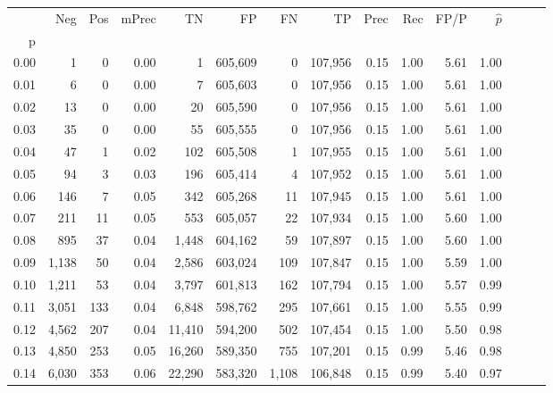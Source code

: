 \begin{tabular}{rrrrrrrrrrrrrrr}
\toprule
{} &     Neg &    Pos & mPrec &       TN &       FP &       FN &       TP &  Prec &   Rec &  FP/P & $\hat{p}$ \\
p    &         &        &       &          &          &          &          &       &       &       &           \\
\midrule
0.00 &       1 &      0 &  0.00 &        1 &  605,609 &        0 &  107,956 &  0.15 &  1.00 &  5.61 &      1.00 \\
0.01 &       6 &      0 &  0.00 &        7 &  605,603 &        0 &  107,956 &  0.15 &  1.00 &  5.61 &      1.00 \\
0.02 &      13 &      0 &  0.00 &       20 &  605,590 &        0 &  107,956 &  0.15 &  1.00 &  5.61 &      1.00 \\
0.03 &      35 &      0 &  0.00 &       55 &  605,555 &        0 &  107,956 &  0.15 &  1.00 &  5.61 &      1.00 \\
0.04 &      47 &      1 &  0.02 &      102 &  605,508 &        1 &  107,955 &  0.15 &  1.00 &  5.61 &      1.00 \\
0.05 &      94 &      3 &  0.03 &      196 &  605,414 &        4 &  107,952 &  0.15 &  1.00 &  5.61 &      1.00 \\
0.06 &     146 &      7 &  0.05 &      342 &  605,268 &       11 &  107,945 &  0.15 &  1.00 &  5.61 &      1.00 \\
0.07 &     211 &     11 &  0.05 &      553 &  605,057 &       22 &  107,934 &  0.15 &  1.00 &  5.60 &      1.00 \\
0.08 &     895 &     37 &  0.04 &    1,448 &  604,162 &       59 &  107,897 &  0.15 &  1.00 &  5.60 &      1.00 \\
0.09 &   1,138 &     50 &  0.04 &    2,586 &  603,024 &      109 &  107,847 &  0.15 &  1.00 &  5.59 &      1.00 \\
0.10 &   1,211 &     53 &  0.04 &    3,797 &  601,813 &      162 &  107,794 &  0.15 &  1.00 &  5.57 &      0.99 \\
0.11 &   3,051 &    133 &  0.04 &    6,848 &  598,762 &      295 &  107,661 &  0.15 &  1.00 &  5.55 &      0.99 \\
0.12 &   4,562 &    207 &  0.04 &   11,410 &  594,200 &      502 &  107,454 &  0.15 &  1.00 &  5.50 &      0.98 \\
0.13 &   4,850 &    253 &  0.05 &   16,260 &  589,350 &      755 &  107,201 &  0.15 &  0.99 &  5.46 &      0.98 \\
0.14 &   6,030 &    353 &  0.06 &   22,290 &  583,320 &    1,108 &  106,848 &  0.15 &  0.99 &  5.40 &      0.97 \\

\end{tabular}
